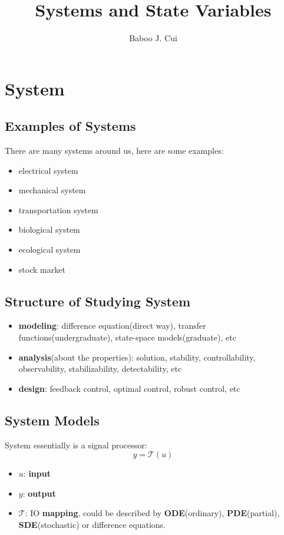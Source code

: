 \documentclass[10pt,a4paper,oneside]{article}
\author{Baboo J. Cui}
\title{Systems and State Variables}
\begin{document}
\maketitle
\tableofcontents

\newpage

\section{System}

\subsection{Examples of Systems}
There are many systems around us, here are some examples:
\begin{itemize}
	\item electrical system
	\item mechanical system
	\item transportation system
	\item biological system
	\item ecological system
	\item stock market
\end{itemize}

\subsection{Structure of Studying System}
\begin{itemize}
	\item \textbf{modeling}: difference equation(direct way), transfer functions(undergraduate), state-space models(graduate), etc
	\item \textbf{analysis}(about the properties): solution, stability, controllability, observability, stabilizability, detectability, etc
	\item \textbf{design}: feedback control, optimal control, robust control, etc
\end{itemize}

\subsection{System Models}
System essentially is a signal processor:
\[
y = \mathcal{T}(u)
\]
\begin{itemize}
	\item $u$: \textbf{input}
	\item $y$: \textbf{output}
	\item $\mathcal{T}$: IO \textbf{mapping}, could be described by \textbf{ODE}(ordinary), \textbf{PDE}(partial), \textbf{SDE}(stochastic) or difference equations.
\end{itemize}
\end{document}
